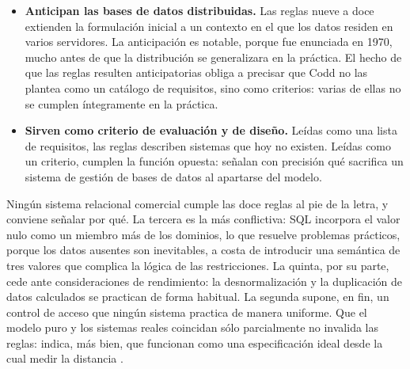 \begin{itemize}
    el modelo relacional.
  \item \textbf{Anticipan las bases de datos distribuidas.} Las reglas nueve a
    doce extienden la formulación inicial a un contexto en el que los datos
    residen en varios servidores. La anticipación es notable, porque fue
    enunciada en 1970, mucho antes de que la distribución se generalizara en
    la práctica. El hecho de que las reglas resulten anticipatorias obliga a
    precisar que Codd no las plantea como un catálogo de requisitos, sino como
    criterios: varias de ellas no se cumplen íntegramente en la práctica.
  \item \textbf{Sirven como criterio de evaluación y de diseño.} Leídas como
    una lista de requisitos, las reglas describen sistemas que hoy no existen.
    Leídas como un criterio, cumplen la función opuesta: señalan con precisión
    qué sacrifica un sistema de gestión de bases de datos al apartarse del
    modelo.
\end{itemize}

\begin{conceptobox}
Ningún sistema relacional comercial cumple las doce reglas al pie de la letra,
  y conviene señalar por qué. La tercera es la más conflictiva: SQL incorpora
  el valor nulo como un miembro más de los dominios, lo que resuelve problemas
  prácticos, porque los datos ausentes son inevitables, a costa de introducir
  una semántica de tres valores que complica la lógica de las restricciones.
  La quinta, por su parte, cede ante consideraciones de rendimiento: la
  desnormalización y la duplicación de datos calculados se practican de forma
  habitual. La segunda supone, en fin, un control de acceso que ningún sistema
  practica de manera uniforme. Que el modelo puro y los sistemas reales
  coincidan sólo parcialmente no invalida las reglas: indica, más bien, que
  funcionan como una especificación ideal desde la cual medir la distancia
  \cite{silberschatz2019database}.
\end{conceptobox}
